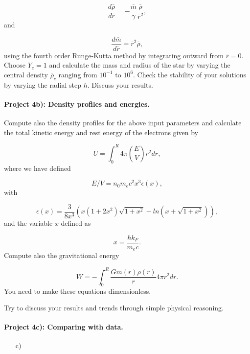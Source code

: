 \documentclass[%
oneside,                 %
final,                   %
10pt]{article}
\begin{document}
\begin{equation*}
\frac{d\overline{\rho}}{d\overline{r}}=-\frac{\overline{m}}{\gamma}\frac{\overline{\rho}}
{\overline{r}^{2}},
\end{equation*}
and

\begin{equation*}
\frac{d\overline{m}}{d\overline{r}}=
\overline{r}^{2}\overline{\rho},
\end{equation*}
using the fourth order Runge-Kutta method by integrating outward from $\overline{r}=0$.
Choose $Y_e=1$ and calculate the mass and radius of the star by varying the central density $\overline{\rho}_c$
ranging from $10^{-1}$ to $10^6$. 
Check the stability of your solutions by varying the radial step $h$. 
Discuss your results.

\paragraph{Project 4b): Density profiles and energies.}
Compute also the density profiles for the above input parameters and calculate the total kinetic energy and rest energy
of the electrons given by

\begin{equation*}
   U=\int_0^R4\pi \left( \frac{E}{V}\right )r^2dr,
\end{equation*}
where we have defined

\begin{equation*}
E/V=n_0m_ec^2x^3\epsilon (x),
\end{equation*}
with

\begin{equation*}
\epsilon (x) =
\frac{3}{8x^3}\left( x(1+2x^2)\sqrt{1+x^2}-ln(x+\sqrt{1+x^2})\right),
\end{equation*}
and the variable $x$ defined as

\begin{equation*}
x=\frac{\hbar k_F}{m_ec}.
\end{equation*}
Compute also the gravitational energy

\begin{equation*}
  W=-\int_0^R\frac{Gm(r)\rho(r)}{r}4\pi r^2dr.
\end{equation*}
You need to make these equations dimensionless. 

Try to discuss your results and trends through simple
physical reasoning.

\paragraph{Project 4c): Comparing with data.}
\begin{itemize}
  \item [c)]
\end{itemize}
\end{document}
